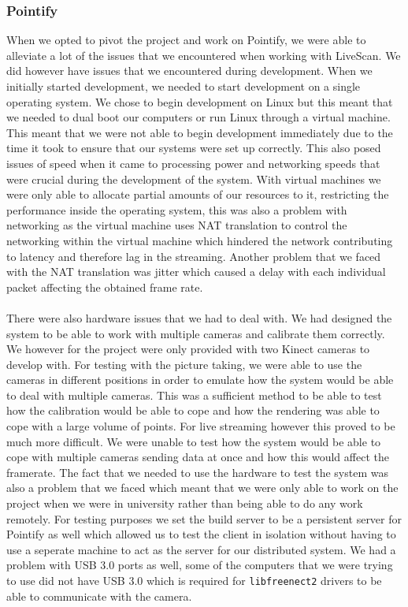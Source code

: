 \documentclass{article}
\begin{document}
\subsubsection{Pointify}
When we opted to pivot the project and work on Pointify, we were able to alleviate a lot of the issues that we encountered when working with LiveScan. We did however have issues that we encountered during development. When we initially started development, we needed to start development on a single operating system. We chose to begin development on Linux but this meant that we needed to dual boot our computers or run Linux through a virtual machine. This meant that we were not able to begin development immediately due to the time it took to ensure that our systems were set up correctly. This also posed issues of speed when it came to processing power and networking speeds that were crucial during the development of the system. With virtual machines we were only able to allocate partial amounts of our resources to it, restricting the performance inside the operating system, this was also a problem with networking as the virtual machine uses NAT translation to control the networking within the virtual machine which hindered the network contributing to latency and therefore lag in the streaming. Another problem that we faced with the NAT translation was jitter which caused a delay with each individual packet affecting the obtained frame rate. 
\\\\
There were also hardware issues that we had to deal with. We had designed the system to be able to work with multiple cameras and calibrate them correctly. We however for the project were only provided with two Kinect cameras to develop with. For testing with the picture taking, we were able to use the cameras in different positions in order to emulate how the system would be able to deal with multiple cameras. This was a sufficient method to be able to test how the calibration would be able to cope and how the rendering was able to cope with a large volume of points. For live streaming however this proved to be much more difficult. We were unable to test how the system would be able to cope with multiple cameras sending data at once and how this would affect the framerate. The fact that we needed to use the hardware to test the system was also a problem that we faced which meant that we were only able to work on the project when we were in university rather than being able to do any work remotely. For testing purposes we set the build server to be a persistent server for Pointify as well which allowed us to test the client in isolation without having to use a seperate machine to act as the server for our distributed system. We had a problem with USB 3.0 ports as well, some of the computers that we were trying to use did not have USB 3.0 which is required for \texttt{libfreenect2} drivers to be able to communicate with the camera.
\newpage
\end{document}
